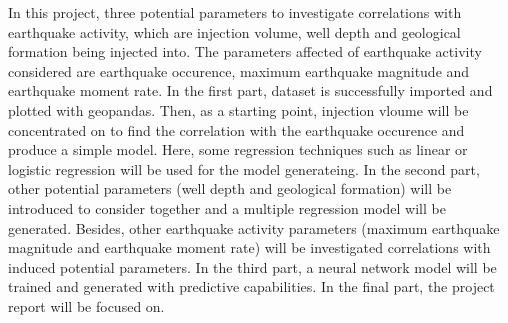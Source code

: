 \documentclass[project-plan]{report-template}
\begin{document}
In this project, three potential parameters to investigate correlations with earthquake activity, which are injection volume, well depth and geological formation being injected into.
The parameters affected of earthquake activity considered are earthquake occurence, maximum earthquake magnitude and earthquake moment rate.
In the first part, dataset is successfully imported and plotted with geopandas. Then, as a starting point, injection vloume will be concentrated on to find the correlation with the earthquake occurence and produce a simple model. 
Here, some regression techniques such as linear or logistic regression will be used for the model generateing.
In the second part, other potential parameters (well depth and geological formation) will be introduced to consider together and a multiple regression model will be generated.
Besides, other earthquake activity parameters (maximum earthquake magnitude and earthquake moment rate) will be investigated correlations with induced potential parameters.
In the third part, a neural network model will be trained and generated with predictive capabilities.
In the final part, the project report will be focused on. 


\end{document}
